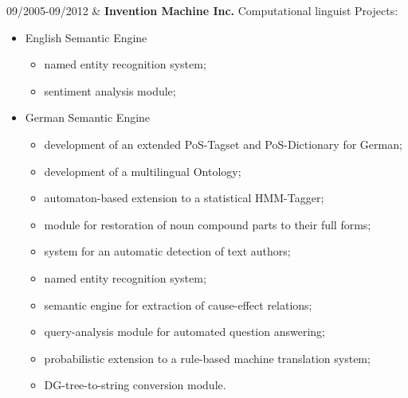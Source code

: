 \documentclass{article}
\begin{document}
{  09/2005-09/2012 & \textbf{Invention Machine Inc.}\newline
  Computational linguist\newline
  Projects: %
  \begin{itemize}
    \setlength{\topsep}{0pt}
    \setlength{\partopsep}{0pt}
    \setlength{\itemsep}{0pt}
    \setlength{\parsep}{0pt}
  \item English Semantic Engine\vspace{-7pt}
    \begin{itemize}
      \setlength{\topsep}{0pt}
      \setlength{\partopsep}{0pt}
      \setlength{\itemsep}{0pt}
      \setlength{\parsep}{0pt}
    \item named entity recognition system;
    \item sentiment analysis module;
    \end{itemize}
  \item German Semantic Engine\vspace{-5pt}
    \begin{itemize}
      \setlength{\topsep}{0pt}
      \setlength{\partopsep}{0pt}
      \setlength{\itemsep}{0pt}
      \setlength{\parsep}{0pt}
    \item development of an extended PoS-Tagset and PoS-Dictionary for
      German;
    \item development of a multilingual Ontology;
    \item automaton-based extension to a statistical HMM-Tagger;
    \item module for restoration of noun compound parts to their full forms;
    \item system for an automatic detection of text authors;
    \item named entity recognition system;
    \item semantic engine for extraction of cause-effect relations;
    \item query-analysis module for automated question answering;
    \item probabilistic extension to a rule-based machine translation
      system;
    \item DG-tree-to-string conversion module.
    \end{itemize}
  \end{itemize}
}
\end{document}
